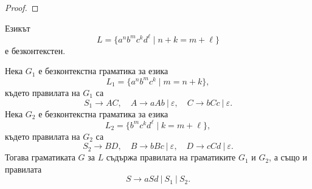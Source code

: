 \begin{proof}
\end{proof}

\begin{example}
  Езикът 
  \[L = \{a^nb^mc^kd^\ell \mid n+k = m + \ell\}\]
  е безконтекстен.
\end{example}
\begin{hint}
  Нека $G_1$ е безконтекстна граматика за езика
  \[L_1 = \{a^nb^mc^k \mid m = n+k\},\]
  където правилата на $G_1$ са
  \[S_1 \to AC,\quad  A \to aAb\ |\ \varepsilon,\quad C \to bCc\ |\ \varepsilon.\]
  Нека $G_2$ е безконтекстна граматика за езика 
  \[L_2 = \{b^mc^kd^\ell \mid k = m+\ell\},\]
  където правилата на $G_2$ са
  \[S_2 \to BD,\quad B \to bBc\ |\ \varepsilon,\quad D \to cCd\ |\ \varepsilon.\]
  Тогава граматиката $G$ за $L$ 
  съдържа правилата на граматиките $G_1$ и $G_2$, а също и правилата
  \[S \to aSd\ |\ S_1\ |\ S_2.\]
\end{hint}

